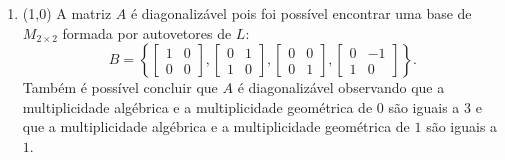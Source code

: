 \documentclass[12pt,a4paper]{article}
\begin{document}
\begin{ExerciseList}
\begin{enumerate}
\begin{itemize}
\end{itemize}

\item (1,0) A matriz $A$ é diagonalizável pois foi possível encontrar uma base de $M_{2 \times 2}$ formada por autovetores de $L$:
\[
B = \left\{
\begin{bmatrix}
1 & 0 \\
0 & 0
\end{bmatrix},
\begin{bmatrix}
0 & 1 \\
1 & 0
\end{bmatrix},
\begin{bmatrix}
0 & 0 \\
0 & 1
\end{bmatrix},
\begin{bmatrix}
0 & -1 \\
1 & 0
\end{bmatrix}
\right\}.
\]
Também é possível concluir que $A$ é diagonalizável observando que a multiplicidade algébrica e a multiplicidade geométrica de $0$ são iguais a $3$ e que a multiplicidade algébrica e a multiplicidade geométrica de $1$ são iguais a $1$.

\end{enumerate}


\end{ExerciseList}
\end{document}
